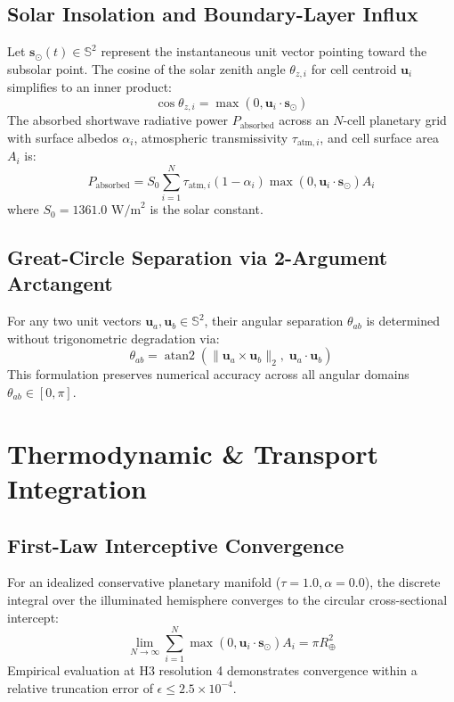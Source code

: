 \documentclass[10pt,journal,compsoc]{IEEEtran}
\begin{document}
\subsection{Solar Insolation and Boundary-Layer Influx}
Let $\mathbf{s}_\odot(t) \in \mathbb{S}^2$ represent the instantaneous unit vector pointing toward the subsolar point. The cosine of the solar zenith angle $\theta_{z, i}$ for cell centroid $\mathbf{u}_i$ simplifies to an inner product:
\begin{equation}
\cos \theta_{z, i} = \max(0, \mathbf{u}_i \cdot \mathbf{s}_\odot)
\end{equation}
The absorbed shortwave radiative power $P_{\text{absorbed}}$ across an $N$-cell planetary grid with surface albedos $\alpha_i$, atmospheric transmissivity $\tau_{\text{atm}, i}$, and cell surface area $A_i$ is:
\begin{equation}
P_{\text{absorbed}} = S_0 \sum_{i=1}^N \tau_{\text{atm}, i} (1 - \alpha_i) \max(0, \mathbf{u}_i \cdot \mathbf{s}_\odot) A_i
\end{equation}
where $S_0 = 1361.0\text{ W/m}^2$ is the solar constant.

\subsection{Great-Circle Separation via 2-Argument Arctangent}
For any two unit vectors $\mathbf{u}_a, \mathbf{u}_b \in \mathbb{S}^2$, their angular separation $\theta_{ab}$ is determined without trigonometric degradation via:
\begin{equation}
\theta_{ab} = \operatorname{atan2}\left(\|\mathbf{u}_a \times \mathbf{u}_b\|_2, \; \mathbf{u}_a \cdot \mathbf{u}_b\right)
\end{equation}
This formulation preserves numerical accuracy across all angular domains $\theta_{ab} \in [0, \pi]$.

\section{Thermodynamic & Transport Integration}

\subsection{First-Law Interceptive Convergence}
For an idealized conservative planetary manifold ($\tau = 1.0, \alpha = 0.0$), the discrete integral over the illuminated hemisphere converges to the circular cross-sectional intercept:
\begin{equation}
\lim_{N \to \infty} \sum_{i=1}^N \max(0, \mathbf{u}_i \cdot \mathbf{s}_\odot) A_i = \pi R_\oplus^2
\end{equation}
Empirical evaluation at H3 resolution 4 demonstrates convergence within a relative truncation error of $\epsilon \le 2.5 \times 10^{-4}$.
\end{document}
